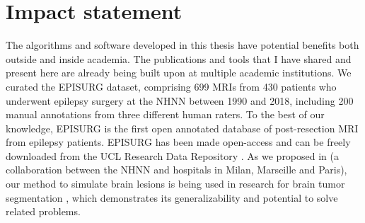 \chapter{Impact statement}

\acresetall

The algorithms and software developed in this thesis have potential benefits both outside and inside academia.
The publications and tools that I have shared and present here are already being built upon at multiple academic institutions.
We curated the EPISURG dataset, comprising 699 \acp{MRI} from 430 patients who underwent epilepsy surgery at the \ac{NHNN} between 1990 and 2018, including 200 manual annotations from three different human raters.
To the best of our knowledge, EPISURG is the first open annotated database of post-resection \ac{MRI} from epilepsy patients.
EPISURG has been made open-access and can be freely downloaded from the UCL Research Data Repository \cite{perez-garcia_episurg_2020}.
As we proposed in \cite{perez-garcia_self-supervised_2021} (a collaboration between the \ac{NHNN} and hospitals in Milan, Marseille and Paris), our method to simulate brain lesions is being used in research for brain tumor segmentation \cite{zhang_self-supervised_2021}, which demonstrates its generalizability and potential to solve related problems.

